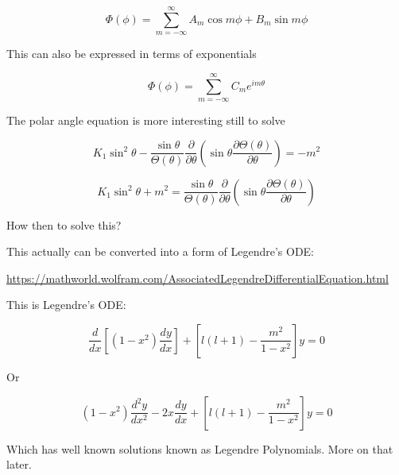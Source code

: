\documentclass[12pt]{article}
\renewcommand{\_}{\kern-1.5pt\textunderscore\kern-1.5pt}
\begin{document}
 \[  \Phi  \left(  \phi  \right) = \sum _{m=-\infty}^{\infty}A_{m}\cos m \phi +B_{m}\sin m \phi  \] \par

This can also be expressed in terms of exponentials\par

 \[  \Phi  \left(  \phi  \right) = \sum _{m=-\infty}^{\infty}C_{m}e^{im \theta } \] \par

The polar angle equation is more interesting still to solve\par

 \[ K_{1}\sin ^{2} \theta -\frac{\sin  \theta }{ \Theta  \left(  \theta  \right) }\frac{ \partial }{ \partial  \theta } \left( \sin  \theta \frac{ \partial  \Theta  \left(  \theta  \right) }{ \partial  \theta } \right) =-m^{2} \] \par

 \[ K_{1}\sin ^{2} \theta +m^{2}=\frac{\sin  \theta }{ \Theta  \left(  \theta  \right) }\frac{ \partial }{ \partial  \theta } \left( \sin  \theta \frac{ \partial  \Theta  \left(  \theta  \right) }{ \partial  \theta } \right)  \] \par

How then to solve this?\par

This actually can be converted into a form of Legendre’s ODE:\par

\href{https://mathworld.wolfram.com/AssociatedLegendreDifferentialEquation.html}{https://mathworld.wolfram.com/AssociatedLegendreDifferentialEquation.html}\par


\vspace{\baselineskip}
This is Legendre’s ODE:\par

 \[ \frac{d}{dx} \left[  \left( 1-x^{2} \right) \frac{dy}{dx} \right] + \left[ l \left( l+1 \right) -\frac{m^{2}}{1-x^{2}} \right] y=0 \] \par

Or \par

 \[  \left( 1-x^{2} \right) \frac{d^{2}y}{dx^{2}}-2x\frac{dy}{dx}+ \left[ l \left( l+1 \right) -\frac{m^{2}}{1-x^{2}} \right] y=0 \] \par


\vspace{\baselineskip}
Which has well known solutions known as Legendre Polynomials. More on that later.\par
\end{document}
